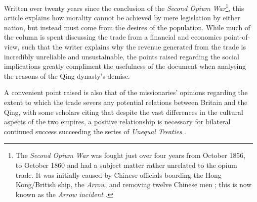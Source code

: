 \documentclass{article}
\begin{document}
Written over twenty years since the conclusion of the \textit{Second Opium War}\footnote{The \textit{Second Opium War} was fought just over four years from  October 1856, to  October 1860 and had a subject matter rather unrelated to the opium trade. It was initially caused by Chinese officials boarding the Hong Kong/British ship, the \textit{Arrow}, and removing twelve Chinese men
\autocite{Wong:2002}; this is now known as the \textit{Arrow incident}
\autocite{Wong:1974}.}, this article explains how morality cannot be achieved by mere legislation by either nation, but instead must come from the desires of the population. While much of the column is spent discussing the trade from a financial and economics point-of-view, such that the writer explains why the revenue generated from the trade is incredibly unreliable and unsustainable, the points raised regarding the social implications greatly compliment the usefulness of the document when analysing the reasons of the Qing dynasty's demise.

A convenient point raised is also that of the missionaries' opinions regarding the extent to which the trade severs any potential relations between Britain and the Qing, with some scholars citing that despite the vast differences in the cultural aspects of the two empires, a positive relationship is necessary for bilateral continued success succeeding the series of \textit{Unequal Treaties}
\autocite{Fairbank:1942}.

\pagebreak
\printbibliography[title={Cited Works}, heading=bibintoc]
\end{document}
